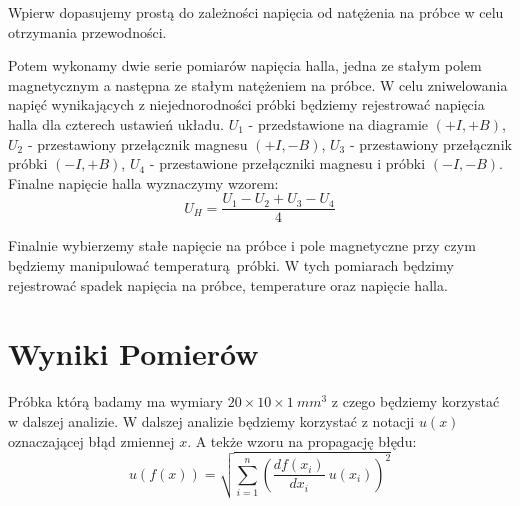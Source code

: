 \documentclass[12pt]{article}
\begin{document}
Wpierw dopasujemy prostą do zależności napięcia od natężenia na próbce w celu otrzymania przewodności.

Potem wykonamy dwie serie pomiarów napięcia halla, jedna ze stałym polem magnetycznym a następna ze stałym natężeniem na próbce.
W celu zniwelowania napięć wynikających z niejednorodności próbki będziemy rejestrować napięcia halla dla czterech ustawień układu.
$U_1$ - przedstawione na diagramie $(+I, +B)$, $U_2$ - przestawiony przełącznik magnesu $(+I, -B)$, $U_3$ - przestawiony przełącznik próbki $(-I, +B)$, $U_4$ - przestawione przełączniki magnesu i próbki $(-I, -B)$.
Finalne napięcie halla wyznaczymy wzorem:
\begin{equation}
    U_H = \frac{U_1 - U_2 + U_3 - U_4}{4}
    \label{eq:effective_hall}
\end{equation}

Finalnie wybierzemy stałe napięcie na próbce i pole magnetyczne przy czym będziemy manipulować temperaturą próbki.
W tych pomiarach będzimy rejestrować spadek napięcia na próbce, temperature oraz napięcie halla.

\section{Wyniki Pomierów}
Próbka którą badamy ma wymiary $20 \times 10 \times 1 \ mm^3$ z czego będziemy korzystać w dalszej analizie.
W dalszej analizie będziemy korzystać z notacji $u(x)$ oznaczającej błąd zmiennej $x$.
A tekże wzoru na propagację błędu:
\[
    u(f(x)) = \sqrt{\sum_{i=1}^{n} (\frac{df(x_i)}{dx_i} \ u(x_i))^2}
\]
\end{document}

